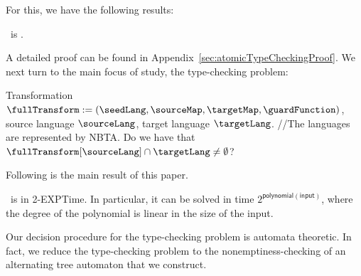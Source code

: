 For this, we have the following results:
\begin{theorem}\label{thm:atomicTypecheckingProblem}
    \atomicTypecheckingProblemFull\ is \exptc.
\end{theorem}

A detailed proof can be found in Appendix~\ref{sec:atomicTypeCheckingProof}. We next turn to the main focus of study, the type-checking problem:

\probdef{\fullTypecheckingProblemFull}{\fullTypecheckingProblemShort}
{Transformation  $\fullTransform := (\seedLang, \sourceMap, \targetMap, \guardFunction)$, source language $\sourceLang$,  target language $\targetLang$. {\color{gray} \slash\slash The  languages are represented by NBTA.}}
{Do we have that $\fullTransform[\sourceLang] \cap \targetLang \neq \emptyset$?}

Following is the main result of this paper.
\begin{theorem}\label{thm:metaTypecheckingUpperBound}
    \fullTypecheckingProblemFull\ is in 2-EXPTime. In particular,  it can be solved in time $2^{\mathsf{polynomial}(\mathsf{input})}$, where the degree of the polynomial is linear in the size of the input. 
\end{theorem}

Our decision procedure for the type-checking problem is automata theoretic. In fact, we reduce the type-checking problem to the nonemptiness-checking of an alternating tree automaton that we construct.